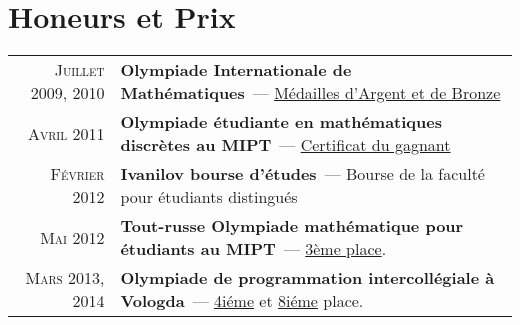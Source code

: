 \documentclass[a4paper,10pt]{article} %
\begin{document}
\vfill


\section{Honeurs et Prix}

\begin{tabular}{rl}
\textsc{Juillet} 2009, 2010 & \textbf{Olympiade Internationale de
Mathématiques}~---
\href{https://www.imo-official.org/participant_r.aspx?id=18778&column=year&order=desc&language=en}{Médailles
d'Argent et de Bronze} \\

\textsc{Avril} 2011 & \textbf{Olympiade étudiante en mathématiques discrètes au
MIPT}~--- \href{https://mipt.ru/dcam/news/n_50milb}{Certificat du gagnant}\\
\textsc{Février} 2012 & \textbf{Ivanilov bourse d'études}~--- 
Bourse de la faculté pour étudiants distingués \\

\textsc{Mai} 2012 & \textbf{Tout-russe Olympiade mathématique pour étudiants au
MIPT}~--- \href{http://www.rkarasev.ru/note/22}{3ème place}. \\

\textsc{Mars} 2013, 2014 & \textbf{Olympiade de programmation intercollégiale à
Vologda}~--- \href{http://olympiads.vologda-uni.ru/interuni/2013.htm}{4iéme} et
\href{http://olympiads.vologda-uni.ru/interuni/2014.htm}{8iéme} place.

\end{tabular}

\vfill
\end{document}
